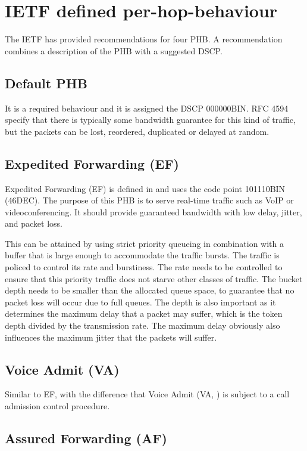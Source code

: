 \section{IETF defined per-hop-behaviour}
The IETF has provided recommendations for four PHB.
A recommendation combines a description of the PHB with a suggested DSCP.

\subsection{Default PHB}

It is a required behaviour and it is assigned the DSCP 000000BIN.
RFC 4594 \cite{rfc4594} specify that there is typically some bandwidth guarantee for this kind of traffic, but the packets can be lost, reordered, duplicated or delayed at random.

\subsection{Expedited Forwarding (EF)}
Expedited Forwarding (EF) is defined in \cite{rfc3246} and uses the code point 101110BIN (46DEC).
The purpose of this PHB is to serve real-time traffic such as VoIP or videoconferencing.
It should provide guaranteed bandwidth with low delay, jitter, and packet loss.

This can be attained by using strict priority queueing in combination with a buffer that is large enough to accommodate the traffic bursts.
The traffic is policed to control its rate and burstiness.
The rate needs to be controlled to ensure that this priority traffic does not starve other classes of traffic.
The bucket depth needs to be smaller than the allocated queue space, to guarantee that no packet loss will occur due to full queues.
The depth is also important as it determines the maximum delay that a packet may suffer, which is the token depth divided by the transmission rate.
The maximum delay obviously also influences the maximum jitter that the packets will suffer.

\subsection{Voice Admit (VA)}

Similar to EF, with the difference that Voice Admit (VA, \cite{rfc5865}) is subject to a call admission control procedure.

\subsection{Assured Forwarding (AF)}


